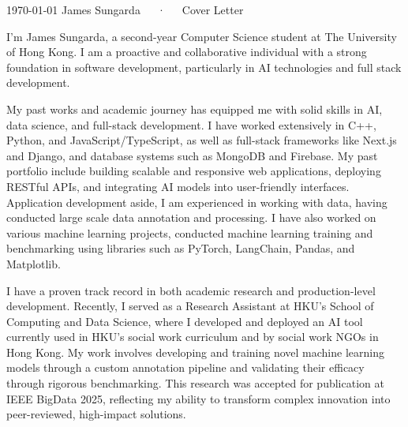 \documentclass[11pt, a4paper]{awesome-cv}
\begin{document}
\makecvheader[R]

\makecvfooter
  {\today}
  {James Sungarda~~~·~~~Cover Letter}
  {}

\makelettertitle

\begin{cvletter}

I’m James Sungarda, a second-year Computer Science student at The University of Hong Kong. I am a proactive and
collaborative individual with a strong foundation in software development, particularly in AI technologies and full stack
development.

My past works and academic journey has equipped me with solid skills in AI, data science, and full-stack development.
I have worked extensively in C++, Python, and JavaScript/TypeScript, as well as full-stack frameworks like Next.js and Django, and database systems such as MongoDB and Firebase. 
My past portfolio include building scalable and
responsive web applications, deploying RESTful APIs, and integrating AI models into user-friendly interfaces.
Application development aside, 
I am experienced in working with data, having conducted large scale data annotation
and processing. 
I have also worked on various machine learning projects, conducted machine learning training and
benchmarking using libraries such as PyTorch, LangChain, Pandas, and Matplotlib.

I have a proven track record in both academic research and production-level development. Recently, I served as a Research Assistant at HKU’s School of Computing and Data Science, where I developed and deployed an AI tool currently used in HKU’s social work curriculum and by social work NGOs in Hong Kong. 
My work involves developing and training novel machine learning models through a custom annotation pipeline and validating their eﬀicacy through
rigorous benchmarking. 
This research was accepted for publication at IEEE BigData 2025, 
reflecting my ability to transform complex innovation into peer-reviewed, high-impact solutions.


\end{cvletter}
\end{document}
